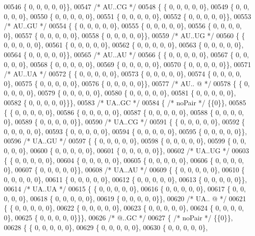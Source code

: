 \begin{DoxyCode}
00546 \{  0, 0, 0, 0, 0\}\},
00547  \textcolor{comment}{/* AU..CG */}
00548 \{ \{  0, 0, 0, 0, 0\},
00549 \{  0, 0, 0, 0, 0\},
00550 \{  0, 0, 0, 0, 0\},
00551 \{  0, 0, 0, 0, 0\},
00552 \{  0, 0, 0, 0, 0\}\},
00553  \textcolor{comment}{/* AU..GU */}
00554 \{ \{  0, 0, 0, 0, 0\},
00555 \{  0, 0, 0, 0, 0\},
00556 \{  0, 0, 0, 0, 0\},
00557 \{  0, 0, 0, 0, 0\},
00558 \{  0, 0, 0, 0, 0\}\},
00559  \textcolor{comment}{/* AU..UG */}
00560 \{ \{  0, 0, 0, 0, 0\},
00561 \{  0, 0, 0, 0, 0\},
00562 \{  0, 0, 0, 0, 0\},
00563 \{  0, 0, 0, 0, 0\},
00564 \{  0, 0, 0, 0, 0\}\},
00565  \textcolor{comment}{/* AU..AU */}
00566 \{ \{  0, 0, 0, 0, 0\},
00567 \{  0, 0, 0, 0, 0\},
00568 \{  0, 0, 0, 0, 0\},
00569 \{  0, 0, 0, 0, 0\},
00570 \{  0, 0, 0, 0, 0\}\},
00571  \textcolor{comment}{/* AU..UA */}
00572 \{ \{  0, 0, 0, 0, 0\},
00573 \{  0, 0, 0, 0, 0\},
00574 \{  0, 0, 0, 0, 0\},
00575 \{  0, 0, 0, 0, 0\},
00576 \{  0, 0, 0, 0, 0\}\},
00577  \textcolor{comment}{/* AU.. @ */}
00578 \{ \{  0, 0, 0, 0, 0\},
00579 \{  0, 0, 0, 0, 0\},
00580 \{  0, 0, 0, 0, 0\},
00581 \{  0, 0, 0, 0, 0\},
00582 \{  0, 0, 0, 0, 0\}\}\},
00583  \textcolor{comment}{/* UA..GC */}
00584 \{ \textcolor{comment}{/* noPair */} \{\{0\}\},
00585 \{ \{  0, 0, 0, 0, 0\},
00586 \{  0, 0, 0, 0, 0\},
00587 \{  0, 0, 0, 0, 0\},
00588 \{  0, 0, 0, 0, 0\},
00589 \{  0, 0, 0, 0, 0\}\},
00590  \textcolor{comment}{/* UA..CG */}
00591 \{ \{  0, 0, 0, 0, 0\},
00592 \{  0, 0, 0, 0, 0\},
00593 \{  0, 0, 0, 0, 0\},
00594 \{  0, 0, 0, 0, 0\},
00595 \{  0, 0, 0, 0, 0\}\},
00596  \textcolor{comment}{/* UA..GU */}
00597 \{ \{  0, 0, 0, 0, 0\},
00598 \{  0, 0, 0, 0, 0\},
00599 \{  0, 0, 0, 0, 0\},
00600 \{  0, 0, 0, 0, 0\},
00601 \{  0, 0, 0, 0, 0\}\},
00602  \textcolor{comment}{/* UA..UG */}
00603 \{ \{  0, 0, 0, 0, 0\},
00604 \{  0, 0, 0, 0, 0\},
00605 \{  0, 0, 0, 0, 0\},
00606 \{  0, 0, 0, 0, 0\},
00607 \{  0, 0, 0, 0, 0\}\},
00608  \textcolor{comment}{/* UA..AU */}
00609 \{ \{  0, 0, 0, 0, 0\},
00610 \{  0, 0, 0, 0, 0\},
00611 \{  0, 0, 0, 0, 0\},
00612 \{  0, 0, 0, 0, 0\},
00613 \{  0, 0, 0, 0, 0\}\},
00614  \textcolor{comment}{/* UA..UA */}
00615 \{ \{  0, 0, 0, 0, 0\},
00616 \{  0, 0, 0, 0, 0\},
00617 \{  0, 0, 0, 0, 0\},
00618 \{  0, 0, 0, 0, 0\},
00619 \{  0, 0, 0, 0, 0\}\},
00620  \textcolor{comment}{/* UA.. @ */}
00621 \{ \{  0, 0, 0, 0, 0\},
00622 \{  0, 0, 0, 0, 0\},
00623 \{  0, 0, 0, 0, 0\},
00624 \{  0, 0, 0, 0, 0\},
00625 \{  0, 0, 0, 0, 0\}\}\},
00626  \textcolor{comment}{/*  @..GC */}
00627 \{ \textcolor{comment}{/* noPair */} \{\{0\}\},
00628 \{ \{  0, 0, 0, 0, 0\},
00629 \{  0, 0, 0, 0, 0\},
00630 \{  0, 0, 0, 0, 0\},

\end{DoxyCode}
